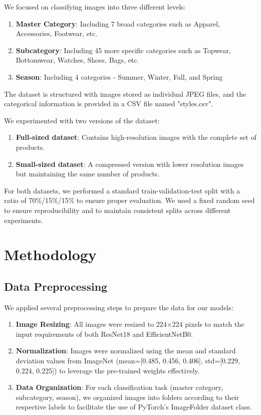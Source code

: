 \documentclass[10pt,journal,compsoc]{IEEEtran}
\begin{document}
We focused on classifying images into three different levels:
\begin{enumerate}
\item \textbf{Master Category}: Including 7 broad categories such as Apparel, Accessories, Footwear, etc.
\item \textbf{Subcategory}: Including 45 more specific categories such as Topwear, Bottomwear, Watches, Shoes, Bags, etc.
\item \textbf{Season}: Including 4 categories - Summer, Winter, Fall, and Spring
\end{enumerate}

The dataset is structured with images stored as individual JPEG files, and the categorical information is provided in a CSV file named "styles.csv".

We experimented with two versions of the dataset:
\begin{enumerate}
\item \textbf{Full-sized dataset}: Contains high-resolution images with the complete set of products.
\item \textbf{Small-sized dataset}: A compressed version with lower resolution images but maintaining the same number of products.
\end{enumerate}

For both datasets, we performed a standard train-validation-test split with a ratio of 70\%/15\%/15\% to ensure proper evaluation. We used a fixed random seed to ensure reproducibility and to maintain consistent splits across different experiments.

\section{Methodology}

\subsection{Data Preprocessing}
We applied several preprocessing steps to prepare the data for our models:

\begin{enumerate}
\item \textbf{Image Resizing}: All images were resized to 224×224 pixels to match the input requirements of both ResNet18 and EfficientNetB0.
\item \textbf{Normalization}: Images were normalized using the mean and standard deviation values from ImageNet (mean=[0.485, 0.456, 0.406], std=[0.229, 0.224, 0.225]) to leverage the pre-trained weights effectively.
\item \textbf{Data Organization}: For each classification task (master category, subcategory, season), we organized images into folders according to their respective labels to facilitate the use of PyTorch's ImageFolder dataset class.
\end{enumerate}
\end{document}
